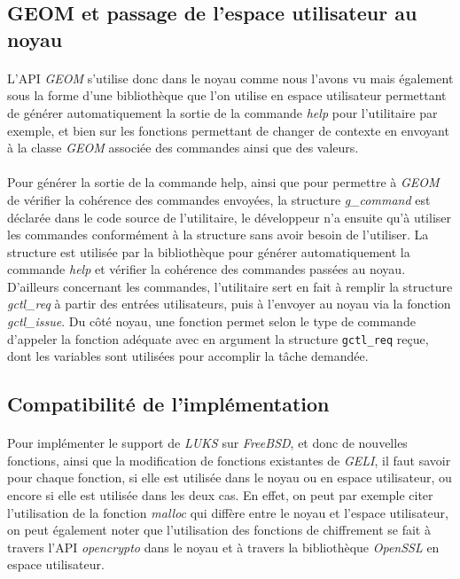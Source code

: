\subsection{GEOM et passage de l'espace utilisateur au noyau}
\paragraph{}
L'API {\em GEOM} s'utilise donc dans le noyau comme nous l'avons vu mais
également sous la forme d'une bibliothèque que l'on utilise en espace
utilisateur permettant de générer automatiquement la sortie de la commande 
{\em help} pour l'utilitaire par exemple, et bien sur les fonctions permettant
de changer de contexte en envoyant à la classe {\em GEOM} associée des commandes
ainsi que des valeurs.

\paragraph{}
Pour générer la sortie de la commande help, ainsi que pour permettre à {\em
  GEOM} de vérifier la cohérence des commandes envoyées, la structure {\em
  g\_command} est déclarée dans le code source de l'utilitaire, le développeur
n'a ensuite qu'à utiliser les commandes conformément à la structure sans avoir
besoin de l'utiliser. La structure est utilisée par la bibliothèque pour générer
automatiquement la commande {\em help} et vérifier la cohérence des commandes
passées au noyau. D'ailleurs concernant les commandes, l'utilitaire sert en fait
à remplir la structure {\em gctl\_req} à partir des entrées utilisateurs, puis
à l'envoyer au noyau via la fonction {\em gctl\_issue}. Du côté noyau, une
fonction permet selon le type de commande d'appeler la fonction adéquate avec en
argument la structure \texttt{gctl\_req} reçue, dont les variables sont
utilisées pour accomplir la tâche demandée.

\subsection{Compatibilité de l'implémentation}
\paragraph{}
Pour implémenter le support de {\em LUKS} sur {\em FreeBSD}, et donc de nouvelles
fonctions, ainsi que la modification de fonctions existantes de {\em GELI}, il
faut savoir pour chaque fonction, si elle est utilisée dans le noyau ou en espace
utilisateur, ou encore si elle est utilisée dans les deux cas. En effet, on peut
par exemple citer l'utilisation de la fonction {\em malloc} qui diffère entre
le noyau et l'espace utilisateur, on peut également noter que l'utilisation des
fonctions de chiffrement se fait à travers l'API {\em opencrypto} dans le noyau
et à travers la bibliothèque {\em OpenSSL} en espace utilisateur. 

